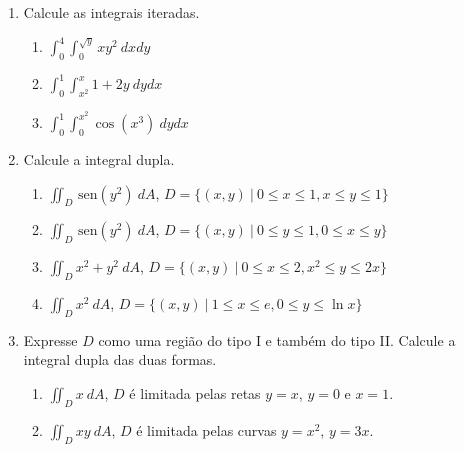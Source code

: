 \documentclass[a4paper,5pt]{amsbook}
\newcommand{\sen}{\,\mbox{sen}}
\newcommand{\ds}{\displaystyle}
\begin{document}
\vspace{1cm}
\begin{enumerate}
    \setlength\itemsep{0.5cm}
    \item Calcule as integrais iteradas.
        \begin{enumerate}
            \setlength\itemsep{0.3cm}
            \item $\ds\int_0^4\int_0^{\sqrt{y}} xy^2\ dxdy$
            \item $\ds\int_0^1\int_{x^2}^x 1+2y\ dydx$
            \item $\ds\int_0^1\int_0^{x^2} \cos{(x^3)}\ dydx$
        \end{enumerate}

    \item Calcule a integral dupla.
        \begin{enumerate}
            \setlength\itemsep{0.3cm}
            \item $\ds\iint_D \sen{(y^2)}\ dA$, $D=\{(x,y)\ |\ 0\le x\le 1, x\le
            y\le 1\}$
            \item $\ds\iint_D \sen{(y^2)}\ dA$, $D=\{(x,y)\ |\ 0\le y\le 1,
            0\le x\le y\}$
            \item $\ds\iint_D x^2+y^2\ dA$, $D=\{(x,y)\ |\ 0\le x\le 2, x^2\le
            y\le 2x\}$
            \item $\ds\iint_D x^2\ dA$, $D=\{(x,y)\ |\ 1\le x\le e, 0\le y\le
            \ln{x}\}$
        \end{enumerate}

    \item Expresse $D$ como uma regi\~ao do tipo I e tamb\'em do tipo II. Calcule a
    integral dupla das duas formas.
        \begin{enumerate}
            \setlength\itemsep{0.3cm}
            \item $\ds\iint_D x\ dA$, $D$ \'e limitada pelas retas $y=x$, $y=0$ e
            $x=1$.
            \item $\ds\iint_D xy\ dA$, $D$ \'e limitada pelas curvas $y=x^2$,
            $y=3x$.
        \end{enumerate}
\end{enumerate}
\end{document}
